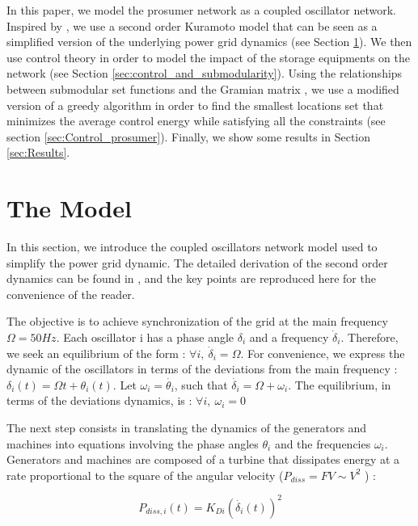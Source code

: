 \documentclass[conference]{IEEEtran}
\begin{document}
 In this paper, we model the prosumer network as a coupled oscillator network. Inspired by \cite{Filatrella2008}, we use a second order Kuramoto model that can be seen as a simplified version of the underlying power grid dynamics (see Section \ref{sec:The_Model}). We then use control theory \cite{Liu2015} in order to model the impact of the storage equipments on the network (see Section \ref{sec:control_and_submodularity}). Using the relationships between submodular set functions and the Gramian matrix \cite{Summers2014}, we use a modified version of a greedy algorithm \cite{Minoux} in order to find the smallest locations set that minimizes the average control energy while satisfying all the constraints (see section \ref{sec:Control_prosumer}). Finally, we show some results in Section \ref{sec:Results}.


\section{The Model}
\label{sec:The_Model}

In this section, we introduce the coupled oscillators network model used to simplify the power grid dynamic. The detailed derivation of the second order dynamics can be found in \cite{Filatrella2008}, and the key points are reproduced here for the convenience of the reader.

 The objective is to achieve synchronization of the grid at the main frequency $ \Omega = 50 Hz $. Each oscillator i has a phase angle $ \delta_i $ and a frequency $ \dot{\delta}_i $. Therefore, we seek an equilibrium of the form : $ \forall i,\ \dot{\delta}_i = \Omega $. For convenience, we express the dynamic of the oscillators in terms of the deviations from the main frequency : $ \delta_i(t) = \Omega t + \theta_i(t) $. Let $ \omega_i = \dot{\theta_i} $, such that $ \dot{\delta_i} = \Omega + \omega_i $. The equilibrium, in terms of the deviations dynamics, is : $ \forall i,\ \omega_i = 0 $

The next step consists in translating the dynamics of the generators and machines into equations involving the phase angles $ \theta_i $ and the frequencies $ \omega_i$. Generators and machines are composed of a turbine that dissipates energy at a rate proportional to the square of the angular velocity ($P_{diss} = FV \sim V^2 $ ) : 

\begin{equation}
  P_{diss, i}(t) = K_{Di}(\dot{\delta_i}(t))^2 
\end{equation}
\end{document}
